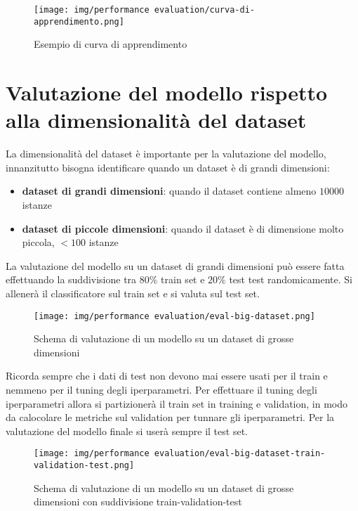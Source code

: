 \begin{figure}[!ht]
    \centering
    \texttt{[image: img/performance evaluation/curva-di-apprendimento.png]}
    \caption{Esempio di curva di apprendimento}
    \label{fig:curva-di-apprendimento}
\end{figure}

\section{Valutazione del modello rispetto alla dimensionalità del dataset}
La dimensionalità del dataset è importante per la valutazione del modello, innanzitutto
bisogna identificare quando un dataset è di grandi dimensioni:
\begin{itemize}
    \item \textbf{dataset di grandi dimensioni}: quando il dataset contiene almeno
    $10000$ istanze
    \item \textbf{dataset di piccole dimensioni}: quando il dataset è di dimensione
    molto piccola, $<100$ istanze
\end{itemize}

La valutazione del modello su un dataset di grandi dimensioni può essere fatta
effettuando la suddivisione tra  $80\%$ train set e $20\%$ test test randomicamente.
Si allenerà il classificatore sul train set e si valuta sul test set.

\begin{figure}[!ht]
    \centering
    \texttt{[image: img/performance evaluation/eval-big-dataset.png]}
    \caption{Schema di valutazione di un modello su un dataset di grosse dimensioni}
    \label{fig:eval-big-dataset}
\end{figure}

Ricorda sempre che i dati di test non devono mai essere usati per il train e nemmeno
per il tuning degli iperparametri. Per effettuare il tuning degli iperparametri allora
si partizionerà il train set in training e validation, in modo da calocolare le
metriche sul validation per tunnare gli iperparametri. Per la valutazione del modello
finale si userà sempre il test set.

\begin{figure}[!ht]
    \centering
    \texttt{[image: img/performance evaluation/eval-big-dataset-train-validation-test.png]}
    \caption{Schema di valutazione di un modello su un dataset di grosse dimensioni con
    suddivisione train-validation-test}
    \label{fig:eval-big-dataset-train-validation-test}
\end{figure}

